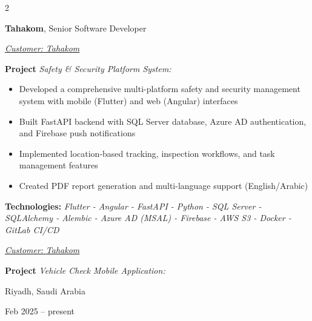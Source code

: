 \documentclass[10pt, a4paper]{article}
\newenvironment{highlights}{
    \begin{itemize}[
        topsep=0.10 cm,
        parsep=0.10 cm,
        partopsep=0pt,
        itemsep=0pt,
        leftmargin=0.4 cm + 10pt
    ]
}{
    \end{itemize}
} %
\newenvironment{twocolentry}[2][]{
    \onecolentry
    \def\secondColumn{#2}
    \setcolumnwidth{\fill, 4.5 cm}
    \begin{paracol}{2}
}{
    \switchcolumn \raggedleft \secondColumn
    \end{paracol}
    \endonecolentry
} %
\begin{document}
        
        \begin{twocolentry}{
            \fontsize{14}{18}Riyadh, Saudi Arabia

        Feb 2025 – present
            \normalsize
        }
            \fontsize{12}{16}
            \textcolor{secondaryColor}{\faBriefcase\hspace{4pt}\textbf{Tahakom},} Senior Software Developer
            \normalsize

            \vspace{0.10 cm}
                \vspace{0.10 cm}

                \textcolor{tertiaryColor}{\faAngleDoubleRight\hspace{0.1cm}\underline{\textit{Customer:} \textit{Tahakom}}}

                \vspace{0.2cm}
                \textbf{Project \faAngleRight} \textit{Safety \& Security Platform System:}

                \begin{highlights}
                        \item Developed a comprehensive multi-platform safety and security management system with mobile (Flutter) and web (Angular) interfaces
                        \item Built FastAPI backend with SQL Server database, Azure AD authentication, and Firebase push notifications
                        \item Implemented location-based tracking, inspection workflows, and task management features
                        \item Created PDF report generation and multi-language support (English/Arabic)
                \end{highlights}
                \faBuffer
                \textbf{ Technologies:} \textit{Flutter - Angular - FastAPI - Python - SQL Server - SQLAlchemy - Alembic - Azure AD (MSAL) - Firebase - AWS S3 - Docker - GitLab CI/CD}

                \vspace{0.10 cm}

                \vspace{0.10 cm}

                \textcolor{tertiaryColor}{\faAngleDoubleRight\hspace{0.1cm}\underline{\textit{Customer:} \textit{Tahakom}}}

                \vspace{0.2cm}
                \textbf{Project \faAngleRight} \textit{Vehicle Check Mobile Application:}


\end{twocolentry}
\end{document}
